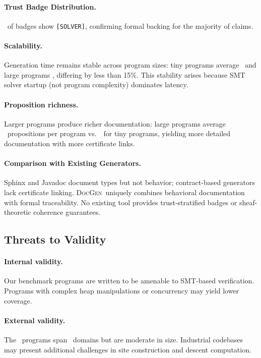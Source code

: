 \documentclass[11pt]{article}
\newcommand{\DocGen}{\textsc{DocGen}}
\begin{document}
\paragraph{Trust Badge Distribution.}
\compTrustSolverdischargedPct\ of badges show \texttt{[SOLVER]},
confirming formal backing for the majority of claims.

\paragraph{Scalability.}
Generation time remains stable across program sizes: tiny programs
average \compTinyMeanTime\ and large programs \compLargeMeanTime,
differing by less than 15\%.  This stability arises because SMT
solver startup (not program complexity) dominates latency.

\paragraph{Proposition richness.}
Larger programs produce richer documentation: large programs average
\compLargeMeanProps\ propositions per program vs.\ \compTinyMeanProps\
for tiny programs, yielding more detailed documentation with more
certificate links.

\paragraph{Comparison with Existing Generators.}
Sphinx and Javadoc document types but not behavior; contract-based
generators lack certificate linking.  \DocGen\ uniquely combines
behavioral documentation with formal traceability.  No existing tool
provides trust-stratified badges or sheaf-theoretic coherence
guarantees.

\subsection{Threats to Validity}

\paragraph{Internal validity.}
Our benchmark programs are written to be amenable to SMT-based
verification.  Programs with complex heap manipulations or
concurrency may yield lower coverage.

\paragraph{External validity.}
The \compTotalPrograms\ programs span \expDomainCount\ domains
but are moderate in size.  Industrial codebases may present
additional challenges in site construction and descent computation.
\end{document}
